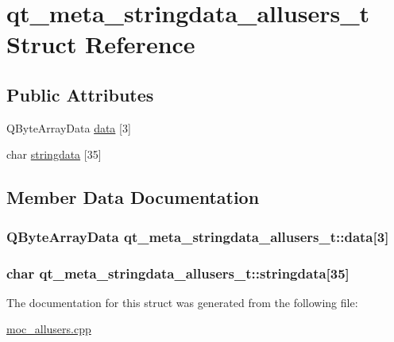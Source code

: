 \hypertarget{structqt__meta__stringdata__allusers__t}{\section{qt\-\_\-meta\-\_\-stringdata\-\_\-allusers\-\_\-t Struct Reference}
\label{structqt__meta__stringdata__allusers__t}
}
\subsection*{Public Attributes}
\begin{DoxyCompactItemize}
\item 
Q\-Byte\-Array\-Data \hyperlink{structqt__meta__stringdata__allusers__t_a472662d0fd6a42547422d09912a47b69}{data} \mbox{[}3\mbox{]}
\item 
char \hyperlink{structqt__meta__stringdata__allusers__t_ac8dd39acccb6eb7b69e326bb60519407}{stringdata} \mbox{[}35\mbox{]}
\end{DoxyCompactItemize}


\subsection{Member Data Documentation}
\hypertarget{structqt__meta__stringdata__allusers__t_a472662d0fd6a42547422d09912a47b69}{
\subsubsection[{data}]{\setlength{\rightskip}{0pt plus 5cm}Q\-Byte\-Array\-Data qt\-\_\-meta\-\_\-stringdata\-\_\-allusers\-\_\-t\-::data\mbox{[}3\mbox{]}}}\label{structqt__meta__stringdata__allusers__t_a472662d0fd6a42547422d09912a47b69}
\hypertarget{structqt__meta__stringdata__allusers__t_ac8dd39acccb6eb7b69e326bb60519407}{
\subsubsection[{stringdata}]{\setlength{\rightskip}{0pt plus 5cm}char qt\-\_\-meta\-\_\-stringdata\-\_\-allusers\-\_\-t\-::stringdata\mbox{[}35\mbox{]}}}\label{structqt__meta__stringdata__allusers__t_ac8dd39acccb6eb7b69e326bb60519407}


The documentation for this struct was generated from the following file\-:\begin{DoxyCompactItemize}
\item 
\hyperlink{moc__allusers_8cpp}{moc\-\_\-allusers.\-cpp}\end{DoxyCompactItemize}
